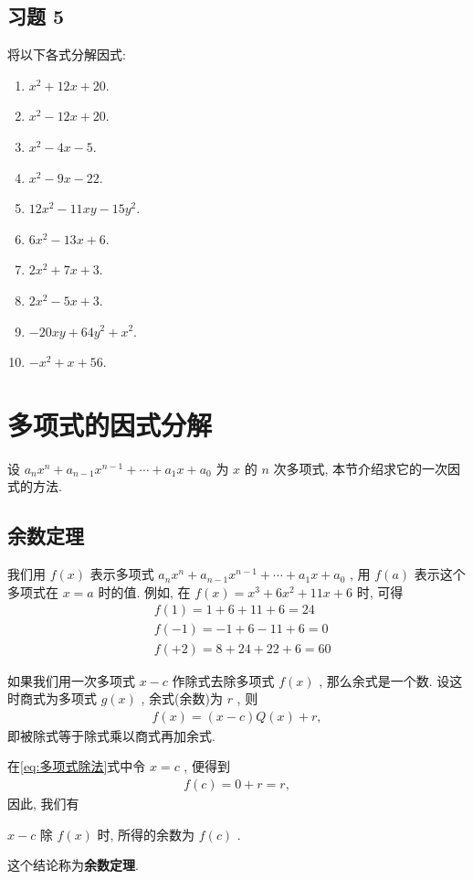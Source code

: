 \subsection*{习题 5}
将以下各式分解因式:
\begin{enumerate}
	\item $ x^{2}+12 x+20$.
	\item $ x^{2}-12 x+20$.
	\item $ x^{2}-4 x-5$.
	\item $ x^{2}-9 x-22$.
	\item $12 x^{2}-11 x y-15 y^{2}$.
	\item $6 x^{2}-13 x+6$.
	\item $2 x^{2}+7 x+3$.
	\item $2 x^{2}-5 x+3$.
	\item $-20 x y+64 y^{2}+x^{2}$.
	\item $-x^{2}+x+56$.
\end{enumerate}


\section{多项式的因式分解}
设 $a_{n} x^{n}+a_{n-1} x^{n-1}+\cdots+a_{1} x+a_{0}$ 为 $x$ 的 $n$ 次多项式, 本节介绍求它的一次因式的方法.
\subsection{余数定理}
我们用 $f(x)$ 表示多项式 $a_{n} x^{n}+a_{n-1} x^{n-1}+\cdots+a_{1} x+a_{0}$ , 用 $f(a)$ 表示这个多项式在 $x=a$ 时的值. 例如, 在 $f(x)=x^{3}+6 x^{2}+11 x+6$ 时, 可得
\begin{align*}
	 & f(1)=1+6+11+6=24   \\
	 & f(-1)=-1+6-11+6=0  \\
	 & f(+2)=8+24+22+6=60
\end{align*}

如果我们用一次多项式 $x-c$ 作除式去除多项式 $f(x)$ , 那么余式是一个数. 设这时商式为多项式 $g(x)$ , 余式(余数)为 $r$ , 则
\begin{align}\label{eq:多项式除法}
	f(x)=(x-c) Q(x)+r,
\end{align}
即被除式等于除式乘以商式再加余式.

在\ref{eq:多项式除法}式中令 $x=c$ , 便得到
\begin{align*}
	f(c)=0+r=r,
\end{align*}
因此, 我们有
\begin{center}
	$x-c$ 除 $f(x)$ 时, 所得的余数为 $f(c)$ .
\end{center}
这个结论称为\textbf{余数定理}.

